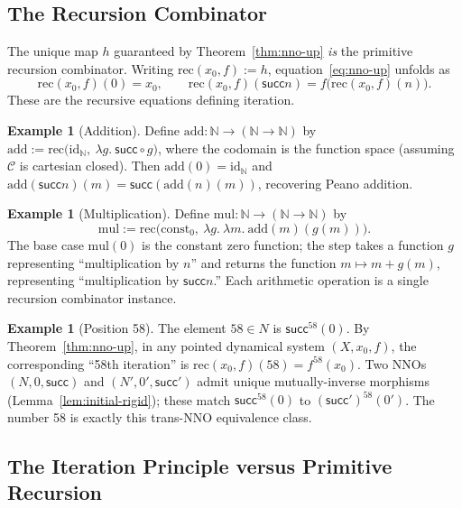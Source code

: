 \documentclass[12pt]{article}
\theoremstyle{definition}
\newtheorem{example}[theorem]{Example}
\theoremstyle{remark}
\newcommand{\N}{\mathbb{N}}
\newcommand{\id}{\mathrm{id}}
\newcommand{\suc}{\mathsf{succ}}
\begin{document}
\subsection{The Recursion Combinator}

The unique map $h$ guaranteed by Theorem~\ref{thm:nno-up} \emph{is} the primitive recursion combinator. Writing $\mathrm{rec}(x_0, f) := h$, equation~\eqref{eq:nno-up} unfolds as
\begin{equation}
\mathrm{rec}(x_0, f)(0) = x_0, \qquad \mathrm{rec}(x_0, f)(\suc n) = f\bigl(\mathrm{rec}(x_0, f)(n)\bigr).
\label{eq:rec-eqs}
\end{equation}
These are the recursive equations defining iteration.

\begin{example}[Addition]
\label{ex:add}
Define $\mathrm{add} \colon \N \to (\N \to \N)$ by $\mathrm{add} := \mathrm{rec}\bigl(\id_\N,\ \lambda g.\ \suc \circ g\bigr)$, where the codomain is the function space (assuming $\mathcal{C}$ is cartesian closed). Then $\mathrm{add}(0) = \id_\N$ and $\mathrm{add}(\suc n)(m) = \suc(\mathrm{add}(n)(m))$, recovering Peano addition.
\end{example}

\begin{example}[Multiplication]
\label{ex:mul}
Define $\mathrm{mul} \colon \N \to (\N \to \N)$ by
\[
\mathrm{mul} := \mathrm{rec}\bigl(\mathrm{const}_0,\ \lambda g.\ \lambda m.\ \mathrm{add}(m)(g(m))\bigr).
\]
The base case $\mathrm{mul}(0)$ is the constant zero function; the step takes a function $g$ representing ``multiplication by $n$'' and returns the function $m \mapsto m + g(m)$, representing ``multiplication by $\suc n$.'' Each arithmetic operation is a single recursion combinator instance.
\end{example}

\begin{example}[Position 58]
\label{ex:58}
The element $58 \in N$ is $\suc^{58}(0)$. By Theorem~\ref{thm:nno-up}, in any pointed dynamical system $(X, x_0, f)$, the corresponding ``58th iteration'' is $\mathrm{rec}(x_0, f)(58) = f^{58}(x_0)$. Two NNOs $(N, 0, \suc)$ and $(N', 0', \suc')$ admit unique mutually-inverse morphisms (Lemma~\ref{lem:initial-rigid}); these match $\suc^{58}(0)$ to $(\suc')^{58}(0')$. The number 58 is exactly this trans-NNO equivalence class.
\end{example}

\subsection{The Iteration Principle versus Primitive Recursion}
\end{document}
